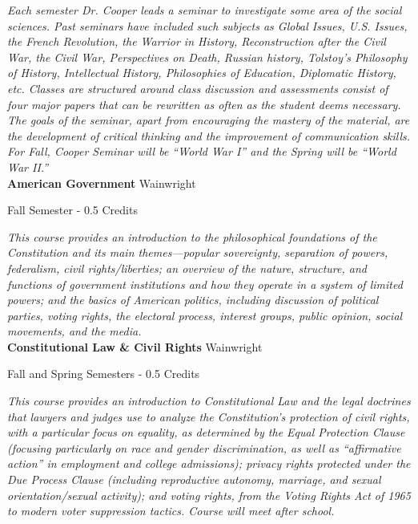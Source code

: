 \vspace{1mm}\emph{Each semester Dr. Cooper leads a seminar to investigate some area of the social sciences. Past seminars have included such subjects as Global Issues, U.S. Issues, the French Revolution, the Warrior in History, Reconstruction after the Civil War, the Civil War, Perspectives on Death, Russian history, Tolstoy’s Philosophy of History, Intellectual History, Philosophies of Education, Diplomatic History, etc. Classes are structured around class discussion and assessments consist of four major papers that can be rewritten as often as the student deems necessary. The goals of the seminar, apart from encouraging the mastery of the material, are the development of critical thinking and the improvement of communication skills.  For Fall, Cooper Seminar will be ``World War I'' and the Spring will be ``World War II.''}\\

\noindent\textbf{American Government} \hfill Wainwright

\noindent Fall Semester - 0.5 Credits

\vspace{1mm}\emph{This course provides an introduction to the philosophical foundations of the Constitution and its main themes—popular sovereignty, separation of powers, federalism, civil rights/liberties; an overview of the nature, structure, and functions of government institutions and how they operate in a system of limited powers; and the basics of American politics, including discussion of political parties, voting rights, the electoral process, interest groups, public opinion, social movements, and the media.}\\

\noindent\textbf{Constitutional Law \& Civil Rights} \hfill Wainwright

\noindent Fall and Spring Semesters - 0.5 Credits

\vspace{1mm}\emph{This course provides an introduction to Constitutional Law and the legal doctrines that lawyers and judges use to analyze the Constitution’s protection of civil rights, with a particular focus on equality, as determined by the Equal Protection Clause (focusing particularly on race and gender discrimination, as well as “affirmative action” in employment and college admissions); privacy rights protected under the Due Process Clause (including reproductive autonomy, marriage, and sexual orientation/sexual activity); and voting rights, from the Voting Rights Act of 1965 to modern voter suppression tactics.  Course will meet after school.}\\

